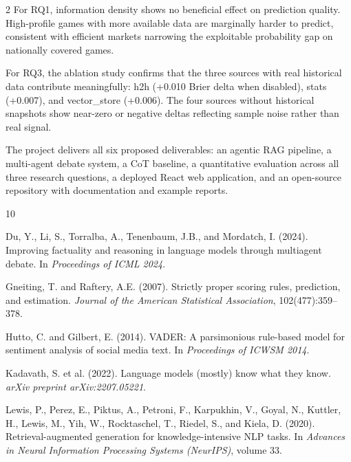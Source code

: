 \documentclass[11pt]{article}
\begin{document}
\begin{multicols}{2}
For RQ1, information density shows no beneficial effect on prediction quality. High-profile games with more available data are marginally harder to predict, consistent with efficient markets narrowing the exploitable probability gap on nationally covered games.

For RQ3, the ablation study confirms that the three sources with real historical data contribute meaningfully: h2h (+0.010 Brier delta when disabled), stats (+0.007), and vector\_store (+0.006). The four sources without historical snapshots show near-zero or negative deltas reflecting sample noise rather than real signal.

The project delivers all six proposed deliverables: an agentic RAG pipeline, a multi-agent debate system, a CoT baseline, a quantitative evaluation across all three research questions, a deployed React web application, and an open-source repository with documentation and example reports.


\begin{thebibliography}{10}

Du, Y., Li, S., Torralba, A., Tenenbaum, J.B., and Mordatch, I. (2024).
\newblock Improving factuality and reasoning in language models through multiagent debate.
\newblock In \textit{Proceedings of ICML 2024}.

Gneiting, T. and Raftery, A.E. (2007).
\newblock Strictly proper scoring rules, prediction, and estimation.
\newblock \textit{Journal of the American Statistical Association}, 102(477):359--378.

Hutto, C. and Gilbert, E. (2014).
\newblock VADER: A parsimonious rule-based model for sentiment analysis of social media text.
\newblock In \textit{Proceedings of ICWSM 2014}.

Kadavath, S. et al. (2022).
\newblock Language models (mostly) know what they know.
\newblock \textit{arXiv preprint arXiv:2207.05221}.

Lewis, P., Perez, E., Piktus, A., Petroni, F., Karpukhin, V., Goyal, N., Kuttler, H., Lewis, M., Yih, W., Rocktaschel, T., Riedel, S., and Kiela, D. (2020).
\newblock Retrieval-augmented generation for knowledge-intensive NLP tasks.
\newblock In \textit{Advances in Neural Information Processing Systems (NeurIPS)}, volume 33.


\end{thebibliography}
\end{multicols}
\end{document}
